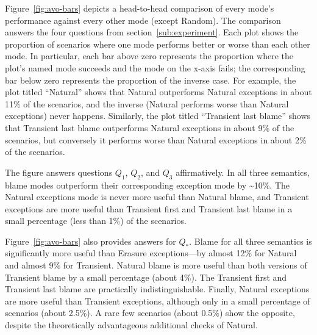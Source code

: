 Figure~\ref{fig:avo-bars} depicts a head-to-head comparison of every
mode's performance against every other mode (except Random). The
comparison  answers the four questions from section~\ref{sub:experiment}. 
Each plot shows the proportion of scenarios where one mode performs
better or worse than each other mode.  In particular, each bar above zero
represents the proportion where the plot's named mode succeeds and the
mode on the x-axis fails; the corresponding bar below zero represents the
proportion of the inverse case.  For example, the plot titled ``Natural''
shows that Natural outperforms Natural exceptions in about 11\% of the
scenarios, and the inverse (Natural performs worse than Natural
exceptions) never happens.  Similarly, the plot titled ``Transient last
blame'' shows that Transient last blame outperforms Natural exceptions
 in about 9\% of the scenarios, but conversely it performs worse
than Natural exceptions in about 2\% of the scenarios.

The figure answers questions $Q_1$, $Q_2$, and $Q_3$ affirmatively.
In all three semantics, blame modes outperform their
corresponding exception mode by \textasciitilde10\%.  The
Natural exceptions mode is never more useful than Natural blame, and
Transient exceptions are more useful than Transient first and Transient
last blame in a small percentage (less than 1\%) of the scenarios. 

Figure~\ref{fig:avo-bars} also provides answers for $Q_*$. Blame for all three
semantics is significantly more useful than Erasure exceptions---by almost
12\% for Natural and almost 9\% for Transient. Natural blame is more useful than
both versions of Transient blame by a small percentage (about 4\%). The
Transient first and Transient last blame are practically indistinguishable.
Finally, Natural exceptions are more useful than Transient exceptions, although
only in a small percentage of scenarios (about 2.5\%). A rare few scenarios
(about 0.5\%) show the opposite, despite the theoretically advantageous
additional checks of Natural.

